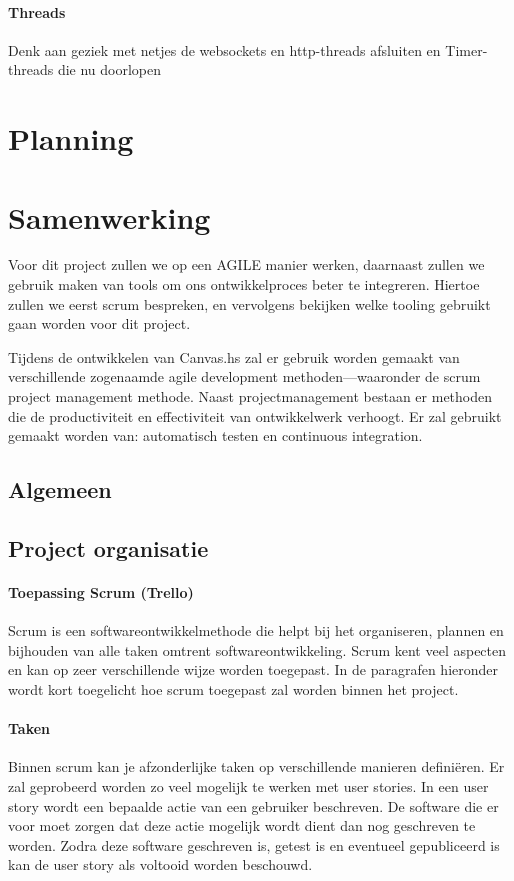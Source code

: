 \paragraph{Threads}
Denk aan geziek met netjes de websockets en http-threads afsluiten en Timer-threads die nu doorlopen
\section{Planning}
\section{Samenwerking}
Voor dit project zullen we op een AGILE manier werken, daarnaast zullen we gebruik maken van tools om ons ontwikkelproces beter te integreren. Hiertoe zullen we eerst scrum bespreken, en vervolgens bekijken welke tooling gebruikt gaan worden voor dit project.

Tijdens de ontwikkelen van Canvas.hs zal er gebruik worden gemaakt van verschillende zogenaamde agile development methoden—waaronder de scrum project management methode. Naast projectmanagement bestaan er methoden die de productiviteit en effectiviteit van ontwikkelwerk verhoogt. Er zal gebruikt gemaakt worden van: automatisch testen en continuous integration.

\subsection{Algemeen}
\subsection{Project organisatie}
\paragraph{Toepassing Scrum (Trello)}
Scrum is een softwareontwikkelmethode die helpt bij het organiseren, plannen en bijhouden van alle taken omtrent softwareontwikkeling. Scrum kent veel aspecten en kan op zeer verschillende wijze worden toegepast. In de paragrafen hieronder wordt kort toegelicht hoe scrum toegepast zal worden binnen het project.
\paragraph{Taken}
Binnen scrum kan je afzonderlijke taken op verschillende manieren definiëren. Er zal geprobeerd worden zo veel mogelijk te werken met user stories. In een user story wordt een bepaalde actie van een gebruiker beschreven. De software die er voor moet zorgen dat deze actie mogelijk wordt dient dan nog geschreven te worden. Zodra deze software geschreven is, getest is en eventueel gepubliceerd is kan de user story als voltooid worden beschouwd.


